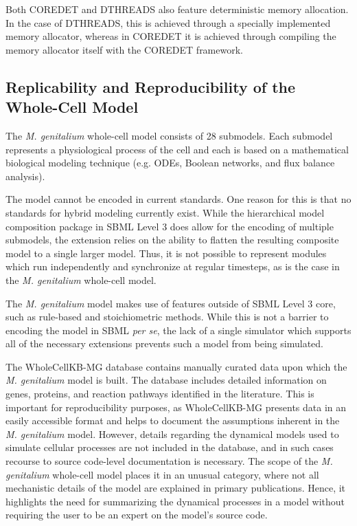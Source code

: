 \documentclass[journal,transmag,twoside]{IEEEtran}
\begin{document}
Both C{\small ORE}D{\small ET} and D{\small THREADS} also
feature deterministic memory allocation. In the case of D{\small THREADS},
this is achieved through a specially implemented memory allocator,
whereas in C{\small ORE}D{\small ET} it is achieved through compiling the
memory allocator itself with the C{\small ORE}D{\small ET} framework.

\subsection{Replicability and Reproducibility of the Whole-Cell Model}

The \textit{M. genitalium} whole-cell model \cite{Karr2012} consists of
28 submodels.
Each submodel represents a physiological process of the cell
and each is based on a mathematical biological modeling technique
(e.g. ODEs, Boolean networks, and flux balance analysis).

The model cannot be encoded in current standards.
One reason for this is that no standards for hybrid modeling currently exist.
While the hierarchical model composition package in SBML Level 3 does allow
for the encoding of multiple submodels, the extension relies on the ability
to flatten the resulting composite model to a single larger model.
Thus, it is not possible to represent modules which run independently
and synchronize at regular timesteps, as is the case in the \textit{M. genitalium} whole-cell model.

The \textit{M. genitalium} model makes use of features outside of SBML Level 3 core,
such as rule-based and stoichiometric methods.
While this is not a barrier to encoding the model in SBML \textit{per se}, the lack
of a single simulator which supports all of the necessary extensions
prevents such a model from being simulated.

The WholeCellKB-MG database \cite{karr2013wholecellkb} contains manually curated data upon which the
\textit{M. genitalium} model is built. The database includes detailed
information on genes, proteins, and reaction pathways identified in the literature.
This is important for reproducibility purposes, as WholeCellKB-MG presents
data in an easily accessible format and helps to document the assumptions
inherent in the \textit{M. genitalium} model.
However, details regarding the dynamical models used to simulate cellular
processes are not included in the database, and in such cases recourse to
source code-level documentation is necessary.
The scope of the \textit{M. genitalium} whole-cell model places it in an
unusual category, where not all mechanistic details of the model are explained in primary
publications. Hence, it highlights the need for summarizing the
dynamical processes in a model without requiring the user to be an expert on the model's
source code.
\end{document}
